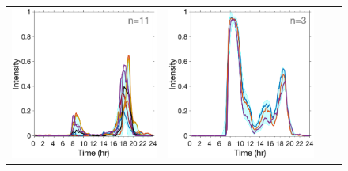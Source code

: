 \documentclass{article}
\begin{document}
\begin{figure}[h!]

	\begin{center}
			\begin{tabular}{cccc}
			\includegraphics[scale=0.1]{../2Fittedy/plot/weekday_7/fitted_y_cluster7_1.eps} 
			&\hspace*{-0.6cm}
			\includegraphics[scale=0.1]{../2Fittedy/plot/weekday_7/fitted_y_cluster7_2.eps} 

\end{tabular}
\end{center}
\end{figure}
\end{document}
